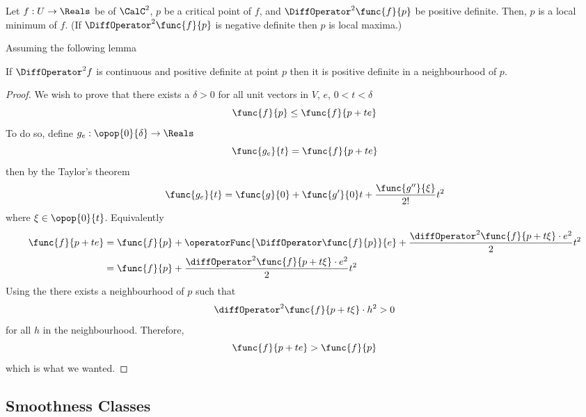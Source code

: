 \begin{theorem}
    Let \(f : U \to \Reals\) be of \(\CalC^2\), \(p\) be a critical point of \(f\), and \(\DiffOperator^2 \func{f}{p}\) be positive definite. Then, \(p\) is a local minimum of \(f\). (If \(\DiffOperator^2 \func{f}{p}\) is negative definite then \(p\) is local maxima.)
\end{theorem}
Assuming the following lemma
\begin{lemma} \label{lm:ContinuityOfPositiveDefinite}
    If \(\DiffOperator^2 f\) is continuous and positive definite at point \(p\) then it is positive definite in a neighbourhood of \(p\).
\end{lemma}
\begin{proof}
    We wish to prove that there exists a \(\delta > 0\) for all unit vectors in \(V\), \(e\), \( 0 < t < \delta\)
    \begin{equation*}
        \func{f}{p} \leq \func{f}{p + te}
    \end{equation*}
    To do so, define \(g_e : \opop{0}{\delta} \to \Reals\)
    \begin{equation*}
        \func{g_e}{t} = \func{f}{p + te}
    \end{equation*}
    then by the Taylor's theorem
    \begin{equation*}
        \func{g_e}{t} = \func{g}{0}  + \func{g'}{0}t + \dfrac{\func{g''}{\xi}}{2!}t^2
    \end{equation*}
    where \(\xi \in \opop{0}{t}\). Equivalently
    \begin{align*}
        \func{f}{p + te} & = \func{f}{p} + \operatorFunc{\DiffOperator \func{f}{p}}{e} + \dfrac{\diffOperator^2 \func{f}{p + t\xi} \cdot e^2}{2}t^2 \\
                         & = \func{f}{p} +  \dfrac{\diffOperator^2 \func{f}{p + t\xi} \cdot e^2}{2}t^2
    \end{align*}
    Using the  there exists a neighbourhood of \(p\) such that
    \begin{equation*}
        \diffOperator^2 \func{f}{p + t\xi} \cdot h^2 > 0
    \end{equation*}
    for all \(h\) in the neighbourhood. Therefore,
    \begin{equation*}
        \func{f}{p + te} > \func{f}{p}
    \end{equation*}
    which is what we wanted.
\end{proof}

\subsection{Smoothness Classes}

